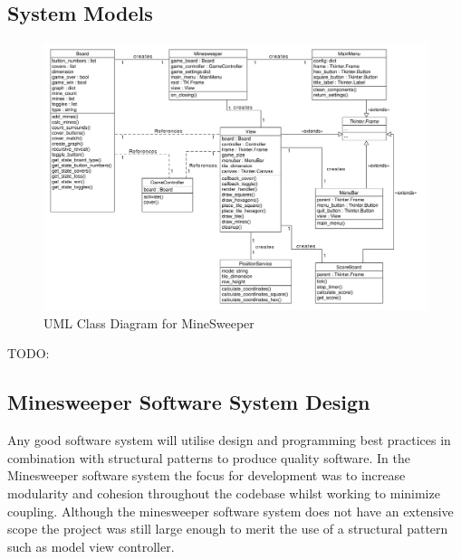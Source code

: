 \documentclass[12pt, a4]{report}
\begin{document}
%
%	
\subsection{System Models}
\begin{figure}[!h]
	\centering
	\includegraphics[scale=0.50]{class}
	\caption{UML Class Diagram for MineSweeper}
	\label{Class}
\end{figure}
TODO:

%
%
\clearpage
\label{SystemDesign}
\subsection{Minesweeper Software System Design}
\par Any good software system will utilise design and programming best practices in combination with structural patterns to produce quality software. In the Minesweeper software system the focus for development was to increase modularity and cohesion throughout the codebase whilst working to minimize coupling. Although the minesweeper software system does not have an extensive scope the project was still large enough to merit the use of a structural pattern such as model view controller.
\end{document}
